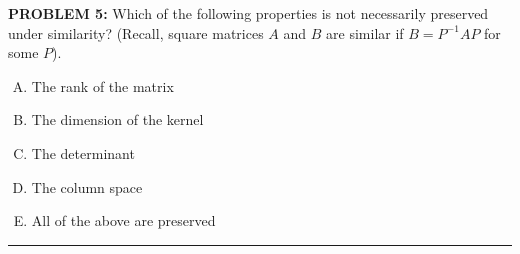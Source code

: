 \documentclass[12pt]{amsart}
\newcommand{\divider}{
  \vspace{-1em} %
  \noindent
  \raisebox{-0.15ex}{\textbullet}%
  \hspace{0.5em}%
  \rule[0.5ex]{0.95\textwidth}{1.0pt}%
  \hspace{0.5em}%
  \raisebox{-0.15ex}{\textbullet}%
  \vspace{0em} %
}
\begin{document}
{\bf PROBLEM 5:}
Which of the following properties is not necessarily preserved under similarity? (Recall, square matrices $A$ and $B$ are similar if $B = P^{-1}AP$ for some $P$). 
%
\begin{enumerate}[(A)]
\item The rank of the matrix
\item The dimension of the kernel
\item The determinant
\item The column space
\item All of the above are preserved
\end{enumerate}
%
%
\divider



\end{document}

